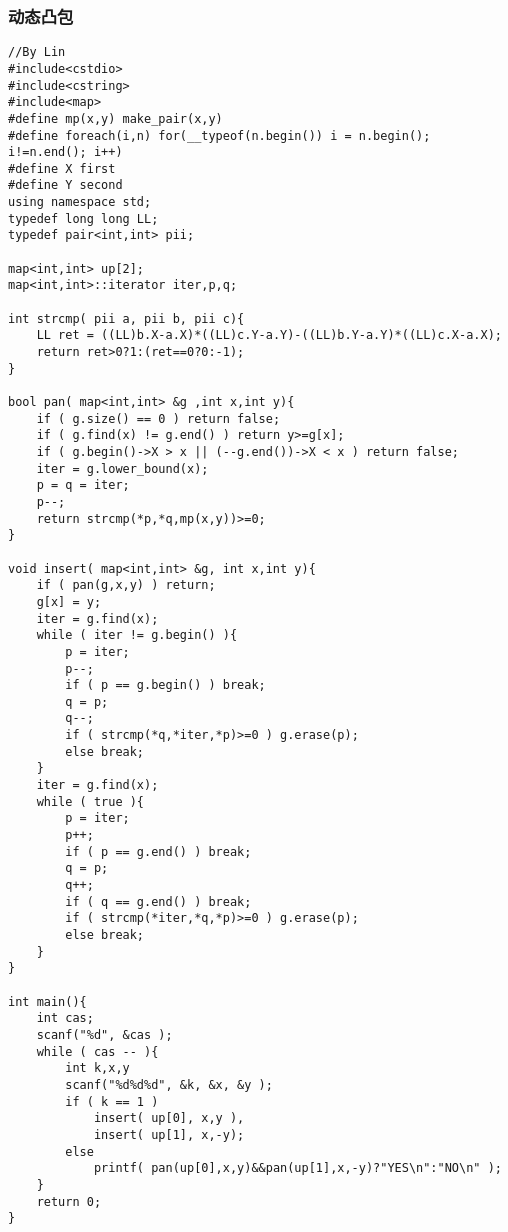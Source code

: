 \subsubsection{动态凸包}
\begin{verbatim}
//By Lin
#include<cstdio>
#include<cstring>
#include<map>
#define mp(x,y) make_pair(x,y)
#define foreach(i,n) for(__typeof(n.begin()) i = n.begin(); i!=n.end(); i++)
#define X first
#define Y second
using namespace std;
typedef long long LL;
typedef pair<int,int> pii;

map<int,int> up[2];
map<int,int>::iterator iter,p,q;

int strcmp( pii a, pii b, pii c){
    LL ret = ((LL)b.X-a.X)*((LL)c.Y-a.Y)-((LL)b.Y-a.Y)*((LL)c.X-a.X);
    return ret>0?1:(ret==0?0:-1);
}

bool pan( map<int,int> &g ,int x,int y){
    if ( g.size() == 0 ) return false;
    if ( g.find(x) != g.end() ) return y>=g[x];
    if ( g.begin()->X > x || (--g.end())->X < x ) return false;
    iter = g.lower_bound(x);
    p = q = iter;
    p--;
    return strcmp(*p,*q,mp(x,y))>=0;
}

void insert( map<int,int> &g, int x,int y){
    if ( pan(g,x,y) ) return;
    g[x] = y;
    iter = g.find(x);
    while ( iter != g.begin() ){
        p = iter;
        p--;
        if ( p == g.begin() ) break;
        q = p;
        q--;
        if ( strcmp(*q,*iter,*p)>=0 ) g.erase(p);
        else break;
    }
    iter = g.find(x);
    while ( true ){
        p = iter;
        p++;
        if ( p == g.end() ) break;
        q = p;
        q++;
        if ( q == g.end() ) break;
        if ( strcmp(*iter,*q,*p)>=0 ) g.erase(p);
        else break;
    }
}

int main(){
    int cas;
    scanf("%d", &cas );
    while ( cas -- ){
        int k,x,y
        scanf("%d%d%d", &k, &x, &y );
        if ( k == 1 )
            insert( up[0], x,y ),
            insert( up[1], x,-y);
        else
            printf( pan(up[0],x,y)&&pan(up[1],x,-y)?"YES\n":"NO\n" );
    }
    return 0;
}
\end{verbatim}

